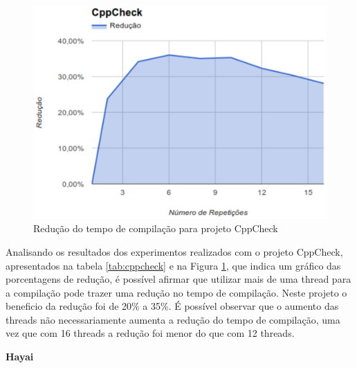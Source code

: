 \begin{figure}[h]
    \centering
        \includegraphics[keepaspectratio=true,scale=1]{figuras/cppcheck.eps}
    \caption{Redução do tempo de compilação para projeto CppCheck}
    \label{cppcheck}
\end{figure}
Analisando os resultados dos experimentos realizados com o projeto
 CppCheck, apresentados na tabela \ref{tab:cppcheck} e na Figura \ref{cppcheck},
 que indica um gráfico das porcentagens de redução, é
 possível afirmar que utilizar mais de uma thread para a
 compilação pode trazer uma redução no tempo de compilação.
 Neste projeto o beneficio da redução foi de 20\% a 35\%.
 É possível observar que o aumento das threads  não
 necessariamente aumenta a redução do tempo de compilação,
 uma vez que com 16 threads  a redução foi menor  do que com 12 threads.


\textbf{Hayai}


